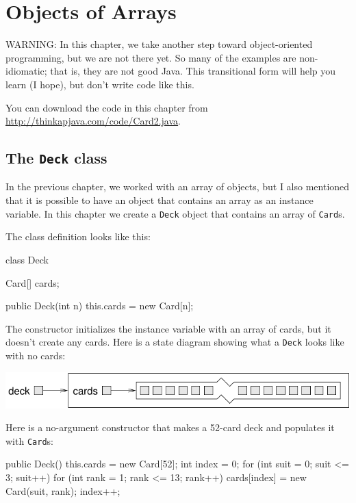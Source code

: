 \chapter{Objects of Arrays}
\label{chap12}

WARNING: In this chapter, we take another step toward object-oriented
programming, but we are not there yet.  So many of the examples are
non-idiomatic; that is, they are not good Java.  This transitional
form will help you learn (I hope), but don't write code like this.

You can download the code in this chapter from
\url{http://thinkapjava.com/code/Card2.java}.


\section{The {\tt Deck} class}
\label{deck}

In the previous chapter, we worked with an array of objects,
but I also mentioned that it is possible to have an object
that contains an array as an instance variable.  In this
chapter we create a {\tt Deck} object
that contains an array of {\tt Card}s.


The class definition looks like this:

\begin{code}
class Deck {
    Card[] cards;

    public Deck(int n) {
        this.cards = new Card[n];
    }
}
\end{code}
%
The constructor initializes the instance variable with
an array of cards, but it doesn't create any cards.
Here is a state diagram showing what a
{\tt Deck} looks like with no cards:


\includegraphics{figs/deckobject.pdf}

Here is a no-argument constructor that makes a
52-card deck and populates it with {\tt Card}s:

\begin{code}
    public Deck() {
        this.cards = new Card[52];
        int index = 0;
        for (int suit = 0; suit <= 3; suit++) {
            for (int rank = 1; rank <= 13; rank++) {
                cards[index] = new Card(suit, rank);
                index++;
            }
        }
    }
\end{code}

